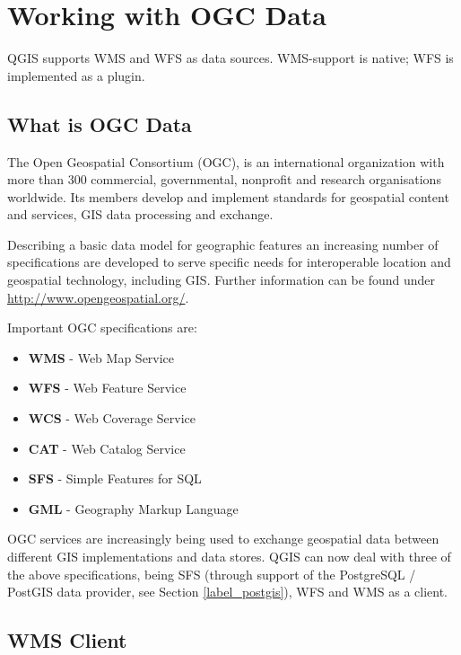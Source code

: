 \chapter{Working with OGC Data}\label{working_with_ogc}


QGIS supports WMS and WFS as data sources. WMS-support is native; WFS is
implemented as a plugin.

\section{What is OGC Data}

The Open Geospatial Consortium (OGC), is an international organization with more than 300
commercial, governmental, nonprofit and research organisations worldwide. Its members
develop and implement standards for geospatial content and services, GIS data processing
and exchange.

Describing a basic data model for geographic features an increasing number of specifications
are developed to serve specific needs for interoperable location and geospatial technology,
including GIS. Further information can be found under \url{http://www.opengeospatial.org/}.

Important OGC specifications are:

\begin{itemize}[label=--]
\item \textbf{WMS} - Web Map Service
\item \textbf{WFS} - Web Feature Service
\item \textbf{WCS} - Web Coverage Service
\item \textbf{CAT} - Web Catalog Service
\item \textbf{SFS} - Simple Features for SQL
\item \textbf{GML} - Geography Markup Language
\end{itemize}

OGC services are increasingly being used to exchange geospatial data between
different GIS implementations and data stores.  QGIS can now deal with three of the
above specifications, being SFS (through support of the PostgreSQL / PostGIS
data provider, see Section \ref{label_postgis}), WFS and WMS as a client.

\section{WMS Client}\label{sec:ogc-wms}

